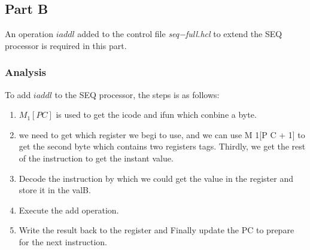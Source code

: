 \documentclass{article}
\begin{document}
\subsection{Part B}
An operation $iaddl$ added to the control file \textit{seq−full.hcl} to extend the SEQ processor is required in this part.
\subsubsection{Analysis}
To add $iaddl$ to the SEQ processor, the steps is as follows:

\begin{enumerate}
\item $M_1[PC]$ is used to get the icode and ifun which conbine a byte.
\item  we need to get which register we begi to use, and we can use M 1[P C + 1] to get the second byte which contains two registers tags.
Thirdly, we get the rest of the instruction to get the instant value. 
\item Decode the instruction by which we could get the value in the register and store it in the valB.
\item Execute the add operation.
\item Write the result back to the register and Finally update the PC to prepare for the next instruction.
\end{enumerate}
\end{document}
